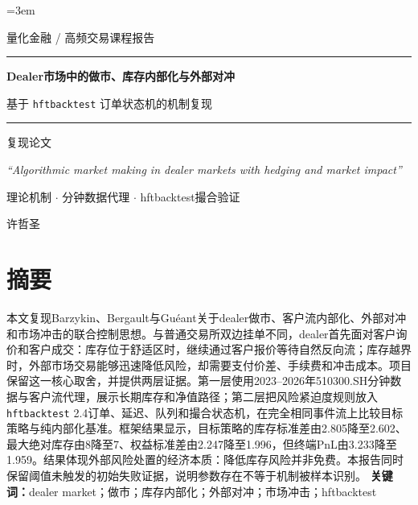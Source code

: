 \documentclass[11pt]{ctexart}
\newcommand{\keywords}[1]{\medskip\noindent\textbf{关键词：}#1}
\begin{document}
\emergencystretch=3em
\begin{titlepage}\centering\vspace*{2.1cm}
{\Large 量化金融 / 高频交易课程报告\par}\vspace{1.2cm}\rule{\linewidth}{0.5pt}\vspace{0.45cm}
{\huge\bfseries Dealer市场中的做市、库存内部化与外部对冲\par}\vspace{0.45cm}
{\Large 基于 \texttt{hftbacktest} 订单状态机的机制复现\par}\vspace{0.45cm}\rule{\linewidth}{0.5pt}\vspace{1cm}
{\large 复现论文\par}\vspace{0.25cm}{\large\itshape Barzykin, Bergault and Guéant (2021)\par}
{\large\itshape ``Algorithmic market making in dealer markets with hedging and market impact''\par}
\vfill{\large 理论机制 $\cdot$ 分钟数据代理 $\cdot$ hftbacktest撮合验证\par}\vspace{0.8cm}
{\Large 许哲圣\par}\vspace{0.3cm}{\large 2026年7月12日\par}
\end{titlepage}
\section*{摘要}
本文复现Barzykin、Bergault与Guéant关于dealer做市、客户流内部化、外部对冲和市场冲击的联合控制思想。与普通交易所双边挂单不同，dealer首先面对客户询价和客户成交：库存位于舒适区时，继续通过客户报价等待自然反向流；库存越界时，外部市场交易能够迅速降低风险，却需要支付价差、手续费和冲击成本。项目保留这一核心取舍，并提供两层证据。第一层使用2023--2026年510300.SH分钟数据与客户流代理，展示长期库存和净值路径；第二层把风险紧迫度规则放入\texttt{hftbacktest} 2.4订单、延迟、队列和撮合状态机，在完全相同事件流上比较目标策略与纯内部化基准。框架结果显示，目标策略的库存标准差由2.805降至2.602、最大绝对库存由8降至7、权益标准差由2.247降至1.996，但终端PnL由3.233降至1.959。结果体现外部风险处置的经济本质：降低库存风险并非免费。本报告同时保留阈值未触发的初始失败证据，说明参数存在不等于机制被样本识别。
\keywords{dealer market；做市；库存内部化；外部对冲；市场冲击；hftbacktest}
\tableofcontents\newpage{}
\end{document}

